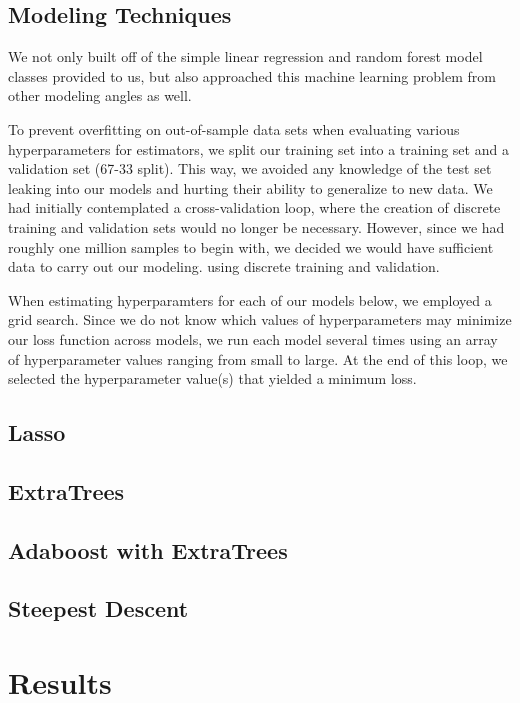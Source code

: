 \documentclass[11pt, oneside]{article}   	%
\begin{document}
\subsection{Modeling Techniques} 

We not only built off of the simple linear regression and random forest model classes provided to us, but also approached this machine learning problem from other modeling angles as well. 

To prevent overfitting on out-of-sample data sets when evaluating various hyperparameters for estimators, we split our training set into a training set and a validation set (67-33 split). This way, we avoided any knowledge of the test set leaking into our models and hurting their ability to generalize to new data. We had initially contemplated a cross-validation loop, where the creation of discrete training and validation sets would no longer be necessary. However, since we had roughly one million samples to begin with, we decided we would have sufficient data to carry out our modeling. using discrete training and validation.

When estimating hyperparamters for each of our models below, we employed a grid search. Since we do not know which values of hyperparameters may minimize our loss function across models, we run each model several times using an array of hyperparameter values ranging from small to large. At the end of this loop, we selected the hyperparameter value(s) that yielded a minimum loss. 

\subsection{Lasso} 

\subsection{ExtraTrees} 

\subsection{Adaboost with ExtraTrees} 
 
\subsection{Steepest Descent} 

\section{Results}
\end{document}
